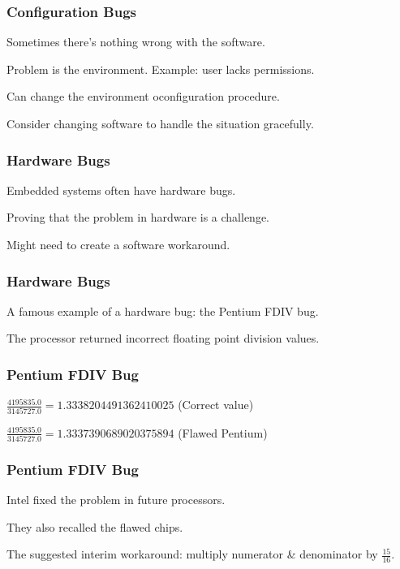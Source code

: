 \begin{frame}
\frametitle{Configuration Bugs}
\begin{changemargin}{1cm}

Sometimes there's nothing wrong with the software.

Problem is the environment. Example: user lacks permissions.

Can change the environment oconfiguration procedure.

Consider changing software to handle the situation gracefully.

\end{changemargin}
\end{frame}

\begin{frame}
\frametitle{Hardware Bugs}
\begin{changemargin}{1cm}

Embedded systems often have hardware bugs.

Proving that the problem in hardware is a challenge.

Might need to create a software workaround.

\end{changemargin}
\end{frame}

\begin{frame}
\frametitle{Hardware Bugs}
\begin{changemargin}{1cm}

A famous example of a hardware bug: the Pentium FDIV bug.

The processor returned incorrect floating point division values.

\end{changemargin}
\end{frame}

\begin{frame}
\frametitle{Pentium FDIV Bug}
\begin{changemargin}{1cm}

$\frac{4195835.0}{3145727.0} = 1.333 820 449 136 241 002 5$  (Correct value)


$\frac{4195835.0}{3145727.0} = 1.333 739 068 902 037 589 4$  (Flawed Pentium)

\end{changemargin}
\end{frame}

\begin{frame}
\frametitle{Pentium FDIV Bug}
\begin{changemargin}{1cm}

Intel fixed the problem in future processors.

They also recalled the flawed chips.

The suggested interim workaround: multiply numerator \& denominator by $\frac{15}{16}$. 

\end{changemargin}
\end{frame}

